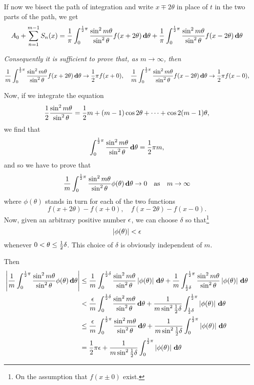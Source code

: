 If now we bisect the path of integration and write $x \mp 2\theta$ in place of
$t$ in the two parts of the path, we get
$$
A_{0}
+ \sum_{n=1}^{m-1} S_{n}(x)
=
\frac{1}{\pi}
\int_{0}^{\frac{1}{2} \pi}
\frac{\sin^{2} m \theta}{\sin^{2} \theta}
f(x + 2\theta) \, \mathbf{d} \theta
+
\frac{1}{\pi}
\int_{0}^{\frac{1}{2} \pi}
\frac{\sin^{2} m \theta}{\sin^{2} \theta}
f(x - 2\theta) \, \mathbf{d} \theta
$$

\emph{Consequently it is sufficient to prove that, as
  $m \rightarrow \infty$, then}
$$
\frac{1}{m}
\int_{0}^{\frac{1}{2}\pi}
\frac{\sin^{2} m \theta}{\sin^{2} \theta}
f(x + 2\theta)
\, \mathbf{d} \theta
\rightarrow
\frac{1}{2} \pi f(x + 0),
\quad
\frac{1}{m}
\int_{0}^{\frac{1}{2}\pi}
\frac{\sin^{2} m \theta}{\sin^{2} \theta}
f(x - 2\theta)
\, \mathbf{d} \theta
\rightarrow
\frac{1}{2} \pi f(x - 0),
$$
%
%

Now, if we integrate the equation
$$
\frac{1}{2}
\frac{\sin^{2} m \theta}{\sin^{2} \theta}
=
\frac{1}{2} m + (m-1) \cos 2\theta + \cdots + \cos 2(m-1)\theta,
$$
we find that
$$
\int_{0}^{\frac{1}{2} \pi}
\frac{\sin^{2} m \theta}{\sin^{2} \theta}
\, \mathbf{d} \theta
=
\frac{1}{2} \pi m,
$$
and so we have to prove that
$$
\frac{1}{m}
\int_{0}^{\half \pi}
\frac{\sin^{2} m \theta}{\sin^{2} \theta}
\phi(\theta)
\dmeasure \theta
\rightarrow
0
\quad
\textrm{as} %
\quad
m \rightarrow \infty
$$
where $\phi(\theta)$ stands in turn for each of the two functions
$$
f(x + 2\theta) - f(x + 0),
\quad
f(x - 2\theta) - f(x - 0).
$$
Now, given an arbitrary positive number $\epsilon$, we can choose $\delta$ so
that\footnote{On the assumption that $f(x \pm 0)$ exist.}
$$
\left| \phi(\theta) \right| < \epsilon
$$
whenever $0 < \theta \leq \frac{1}{2} \delta$. This choice of $\delta$ is obviously independent of $m$.

Then
\begin{align*}
  \left| 
    \frac{1}{m}
    \int_{0}^{\frac{1}{2} \pi}
    \frac{\sin^{2} m\theta}{\sin^{2} \theta}
    \phi(\theta)
    \, \mathbf{d} \theta
   \right|
  &
  \leq
  \frac{1}{m}
  \int_{0}^{\frac{1}{2} \delta}
  \frac{\sin^{2} m\theta}{\sin^{2} \theta}
  \left|  \phi(\theta)  \right|
  \, \mathbf{d} \theta
  +
  \frac{1}{m}
  \int_{\frac{1}{2}\delta}^{\frac{1}{2}\pi}
  \frac{\sin^{2} m\theta}{\sin^{2} \theta}
  \left|  \phi(\theta)  \right|
  \, \mathbf{d} \theta
  \\
  &
  <
  \frac{\epsilon}{m}
  \int_{0}^{\frac{1}{2} \delta}
  \frac{\sin^{2} m\theta}{\sin^{2} \theta}
  \, \mathbf{d} \theta
  +
  \frac{1}{m \sin^{2} \frac{1}{2} \delta}
  \int_{\frac{1}{2} \delta}^{\frac{1}{2} \pi}
  \left| \phi(\theta) \right|
  \, \mathbf{d} \theta
  \\
  &
  \leq
  \frac{\epsilon}{m}
  \int_{0}^{\frac{1}{2} \pi}
  \frac{\sin^{2} m\theta}{\sin^{2} \theta}
  \, \mathbf{d} \theta
  +
  \frac{1}{m \sin^{2} \frac{1}{2}\delta}
  \int_{0}^{\frac{1}{2} \pi}
  \left| \phi(\theta) \right|
  \, \mathbf{d} \theta
  \\
  &
  =
  \frac{1}{2} \pi \epsilon
  +
  \frac{1}{m \sin^{2} \frac{1}{2}\delta}
  \int_{0}^{\frac{1}{2} \pi}
  \left| \phi(\theta) \right|
  \, \mathbf{d} \theta
\end{align*}

